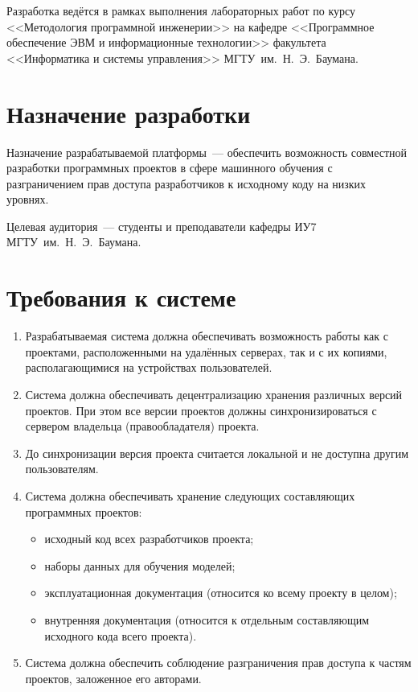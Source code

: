 \documentclass{bmstu}
\begin{document}
  Разработка ведётся в рамках выполнения лабораторных работ по курсу
  <<Методология программной инженерии>> на кафедре <<Программное
  обеспечение ЭВМ и информационные технологии>> факультета
  <<Информатика и системы управления>> МГТУ~им.~Н.~Э.~Баумана.

  \section{Назначение разработки}

  Назначение разрабатываемой платформы~--- обеспечить возможность
  совместной разработки программных проектов в сфере машинного
  обучения с разграничением прав доступа разработчиков к исходному
  коду на низких уровнях.

  Целевая аудитория~--- студенты и преподаватели кафедры ИУ7
  \mbox{МГТУ~им.~Н.~Э.~Баумана}.

  \section{Требования к системе}
  \begin{enumerate}[label*=\arabic*.]
    \item Разрабатываемая система должна обеспечивать возможность
      работы как с проектами, расположенными на удалённых серверах,
      так и с их копиями, располагающимися на устройствах
      пользователей.
    \item Система должна обеспечивать децентрализацию хранения
      различных версий проектов. При этом все версии проектов должны
      синхронизироваться с сервером владельца (правообладателя)
      проекта.
    \item До синхронизации версия проекта считается локальной и не
      доступна другим пользователям.
    \item Система должна обеспечивать хранение следующих составляющих
      программных проектов:
    \begin{itemize}[label*=---]
      \item исходный код всех разработчиков проекта;
      \item наборы данных для обучения моделей;
      \item эксплуатационная документация (относится ко всему проекту
        в целом);
      \item внутренняя документация (относится к отдельным
        составляющим исходного кода всего проекта).
    \end{itemize}
    \item Система должна обеспечить соблюдение разграничения прав
      доступа к частям проектов, заложенное его авторами.
  \end{enumerate}
\end{document}
